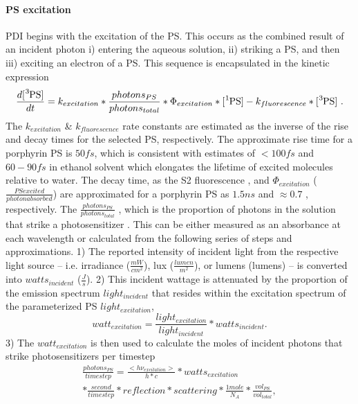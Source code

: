\paragraph{PS excitation}
PDI begins with the excitation of the PS. This occurs as the combined result of an incident photon i) entering the aqueous solution, ii) striking a PS, and then iii) exciting an electron of a PS. This sequence is encapsulated in the kinetic expression
\begin{multline} \label{ps_excitation_kinetics}
    \frac{d[\ce{^3PS}]}{dt} =  k_{excitation}*\frac{photons_{PS}}{photons_{total}} *\Phi_{excitation}*[\ce{^1PS}] - k_{fluorescence}*[\ce{^3PS}]~. 
\end{multline}
The $k_{excitation}$ \& $k_{fluorescence}$ rate constants are estimated as the inverse of the rise and decay times for the selected PS, respectively. The approximate rise time for a porphyrin PS is $50 fs$, which is consistent with estimates of $<100 fs$ \cite{Andersson1999PhotoinducedState} and $60-90 fs$ in ethanol solvent \cite{Gurzadyan1998Time-resolvedZn-tetraphenylporphyrin} which elongates the lifetime of excited molecules relative to water. The decay time, as the S2 fluorescence \cite{Akimoto1999UltrafastPorphyrins}, and $\Phi_{excitation}$ ($\frac{PS excited}{photon absorbed}$) are approximated for a porphyrin PS as $1.5 ns$ and $\approx 0.7$ \cite{Krasnovsky2012PhotochemicalEnvironment}, respectively. The $\frac{photons_{PS}}{photons_{total}}$ \cite{Brasel2020AnAgalactiae}, which is the proportion of photons in the solution that strike a photosensitizer \cite{Santos2020ApplicationAureus}. This can be either measured as an absorbance at each wavelength \cite{Gerola2012ChemicalPhotobleaching} or calculated from the following series of steps and approximations. 1) The reported intensity of incident light from the respective light source -- i.e. irradiance ($\frac{mW}{cm^2}$), lux ($\frac{lumen}{m^2}$), or lumens (lumens) -- is converted into $watts_{incident}$ ($\frac{J}{s}$). 2) This incident wattage is attenuated by the proportion of the emission spectrum $light_{incident}$ that resides within the excitation spectrum of the parameterized PS $light_{excitation}$, 
\begin{equation}
    watt_{excitation} = \frac{light_{excitation}}{light_{incident}}*watts_{incident}.
\end{equation}
3) The $watt_{excitation}$ is then used to calculate the moles of incident photons that strike photosensitizers per timestep 
\begin{multline} \label{photons_per_second}
    \frac{photons_{PS}}{timestep}=\frac{<h\nu_{excitation}>}{h*c}*watts_{excitation} \\
    *\frac{second}{timestep}*reflection*scattering*\frac{1 mole}{N_A}*\frac{vol_{PS}}{vol_{total}},
\end{multline}
